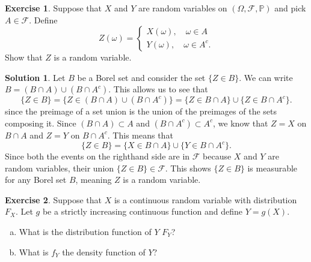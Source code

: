 \documentclass[12pt]{article}
\newcommand{\Prob}{\mathbb{P}}
\newcommand{\calF}{\mathcal{F}}
\theoremstyle{definition}
\newtheorem{exer}{Exercise}
\newtheorem{sol}{Solution}
\theoremstyle{remark}
\begin{document}
\begin{exer}
    Suppose that $X$ and $Y$ are random variables on $(\Omega, \calF, \Prob)$ and pick $A\in \calF$. Define
    \begin{equation}
        Z(\omega) = \begin{cases}
            X(\omega), \quad \omega\in A \\
            Y(\omega), \quad \omega\in A^c.
        \end{cases}
    \end{equation}
    Show that $Z$ is a random variable.
\end{exer}
\begin{sol}
Let $B$ be a Borel set and consider the set $\{ Z \in B\}$. We can write $B = (B\cap A) \cup (B \cap A^c)$. This allows us to see that 
\begin{equation}
    \{ Z \in B\} = \{ Z\in  (B\cap A) \cup (B \cap A^c) \}= \{Z\in B\cap A \} \cup \{Z \in B\cap A^c \}.
\end{equation}
since the preimage of a set union is the union of the preimages of the sets composing it. Since $ (B\cap A)\subset A$ and $(B\cap A^c) \subset A^c$, we know that $Z = X$ on $B\cap A$ and $Z=Y$ on $B\cap A^c$. This means that
\begin{equation}
    \{ Z\in B\} = \{X\in B\cap A \} \cup \{Y \in B\cap A^c\}.
\end{equation}
Since both the events on the righthand side are in $\calF$ because $X$ and $Y$ are random variables, their union $\{Z\in B\}\in\calF$. This shows $\{ Z\in B\}$ is measurable for any Borel set $B$, meaning $Z$ is a random variable.
\end{sol}

\newpage 
\begin{exer}
    Suppose that $X$ is a continuous random variable with distribution $F_X$. Let $g$ be a strictly increasing continuous function and define $Y=g(X)$. 

    \begin{enumerate}[a)]
        \item What is the distribution function of $Y$ $F_Y$?
        \item What is $f_Y$ the density function of $Y$?
    \end{enumerate}
\end{exer}
\end{document}
